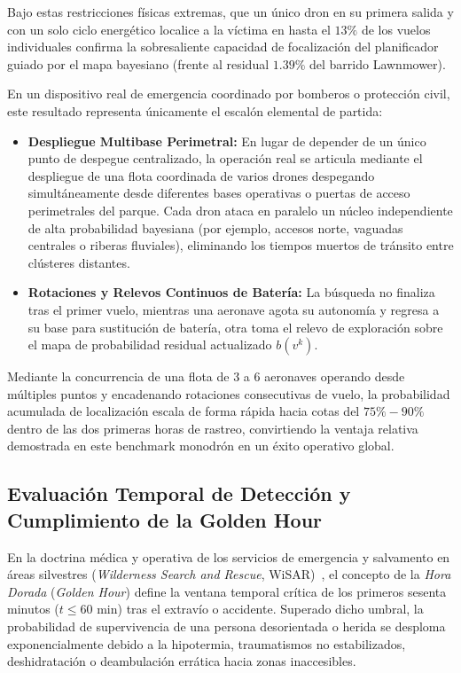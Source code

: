 Bajo estas restricciones físicas extremas, que un único dron en su primera salida y con un solo ciclo energético localice a la víctima en hasta el $13\%$ de los vuelos individuales confirma la sobresaliente capacidad de focalización del planificador guiado por el mapa bayesiano (frente al residual $1.39\%$ del barrido Lawnmower). 

En un dispositivo real de emergencia coordinado por bomberos o protección civil, este resultado representa únicamente el escalón elemental de partida:
\begin{itemize}
    \item \textbf{Despliegue Multibase Perimetral:} En lugar de depender de un único punto de despegue centralizado, la operación real se articula mediante el despliegue de una flota coordinada de varios drones despegando simultáneamente desde diferentes bases operativas o puertas de acceso perimetrales del parque. Cada dron ataca en paralelo un núcleo independiente de alta probabilidad bayesiana (por ejemplo, accesos norte, vaguadas centrales o riberas fluviales), eliminando los tiempos muertos de tránsito entre clústeres distantes.
    \item \textbf{Rotaciones y Relevos Continuos de Batería:} La búsqueda no finaliza tras el primer vuelo, mientras una aeronave agota su autonomía y regresa a su base para sustitución de batería, otra toma el relevo de exploración sobre el mapa de probabilidad residual actualizado $b(v^k)$.
\end{itemize}

Mediante la concurrencia de una flota de 3 a 6 aeronaves operando desde múltiples puntos y encadenando rotaciones consecutivas de vuelo, la probabilidad acumulada de localización escala de forma rápida hacia cotas del $75\% - 90\%$ dentro de las dos primeras horas de rastreo, convirtiendo la ventaja relativa demostrada en este benchmark monodrón en un éxito operativo global.

\subsection{Evaluación Temporal de Detección y Cumplimiento de la Golden Hour}
\label{sec:golden_hour}

En la doctrina médica y operativa de los servicios de emergencia y salvamento en áreas silvestres (\textit{Wilderness Search and Rescue}, WiSAR)~\cite{koester2008lost}, el concepto de la \textit{Hora Dorada} (\textit{Golden Hour}) define la ventana temporal crítica de los primeros sesenta minutos ($t \le 60\text{ min}$) tras el extravío o accidente. Superado dicho umbral, la probabilidad de supervivencia de una persona desorientada o herida se desploma exponencialmente debido a la hipotermia, traumatismos no estabilizados, deshidratación o deambulación errática hacia zonas inaccesibles.

